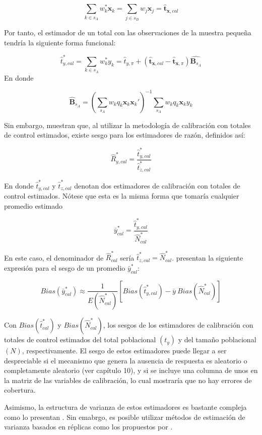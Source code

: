 \documentclass[
  12pt,
  spanish,
]{book}
\begin{document}
\[
\sum_{k\in s_A}w_k^*\mathbf{x}_k =  \sum_{j\in s_B}w_j\mathbf{x}_j = \hat{\mathbf{t}}_{\mathbf{x}, cal}
\]

Por tanto, el estimador de un total con las observaciones de la muestra pequeña tendría la siguiente forma funcional:

\[
\hat{t}_{y, cal}^* 
= \sum_{k\in s_A} w_k^* y_k 
= \hat{t}_{y, \pi} + ( \hat{\mathbf{t}}_{\mathbf{x}, cal} - \hat{\mathbf{t}}_{\mathbf{x}, \pi}) \hat{\mathbf{B}_{s_A}}
\]
En donde

\[
\hat{\mathbf{B}}_{s_A} = \left(\sum_{s_A} w_k q_k \mathbf{x}_k\mathbf{x}_k'\right)^{-1}\sum_{s_A} w_k q_k \mathbf{x}_k y_k
\]

Sin embargo, \citet{Dever_Valliant_2016} muestran que, al utilizar la metodología de calibración con totales de control estimados, existe sesgo para los estimadores de razón, definidos así:

\[
\hat{R}^*_{y, cal} = \frac{\hat{t}_{y, cal}^*}{\hat{t}_{z, cal}^*}
\]

En donde \(\hat{t}_{y, cal}^*\) y \(\hat{t}_{z, cal}^*\) denotan dos estimadores de calibración con totales de control estimados. Nótese que esta es la misma forma que tomaría cualquier promedio estimado

\[
\bar y ^{*}_{cal} = \frac{\hat{t}_{y, cal}^{*}}{\hat{N}^{*}_{cal}}
\]

En este caso, el denominador de \(\hat{R}^{*}_{cal}\) sería \(\hat{t}_{z,cal}^{*} = \hat N^{*}_{cal}\). \citet{Dever_Valliant_2016} presentan la siguiente expresión para el sesgo de un promedio \(\bar y ^{*}_{cal}\):

\[
Bias(\bar y ^{*}_{cal})
\approx
\frac{1}{E(\hat N^{*}_{cal})} 
\left[ Bias(\hat{t}_{y,cal}^{*}) - \bar{y} \ Bias(\hat{N}^{*}_{cal})\right]
\]

Con \(Bias(\hat{t}_{cal}^{*})\) y \(Bias(\hat{N}^{*}_{cal})\), los sesgos de los estimadores de calibración con totales de control estimados del total poblacional \((t_y)\) y del tamaño poblacional \((N)\), respectivamente. El sesgo de estos estimadores puede llegar a ser despreciable si el mecanismo que genera la ausencia de respuesta es aleatorio o completamente aleatorio (ver capítulo 10), y si se incluye una columna de unos en la matriz de las variables de calibración, lo cual mostraría que no hay errores de cobertura.

Asimismo, la estructura de varianza de estos estimadores es bastante compleja como lo presentan \citet{Dever_Valliant_2016}. Sin emabrgo, es posible utilizar métodos de estimación de varianza basados en réplicas como los propuestos por \citet{Opsomer_Erciulescu_2022}.
\end{document}
